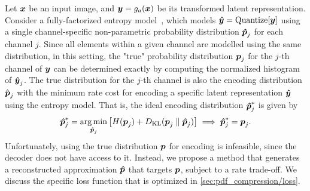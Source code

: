 
Let ${\boldsymbol{x}}$ be an input image, and ${\boldsymbol{y}} = g_a({\boldsymbol{x}})$ be its transformed latent representation.
Consider a fully-factorized entropy model~\cite{balle2018variational}, which models ${\boldsymbol{\hat{y}}} = \operatorname{Quantize}[{\boldsymbol{y}}]$ using a single channel-specific non-parametric probability distribution ${\boldsymbol{\hat{p}}}_j$ for each channel $j$.
Since all elements within a given channel are modelled using the same distribution, in this setting, the "true" probability distribution ${\boldsymbol{p}}_j$ for the $j$-th channel of ${\boldsymbol{y}}$ can be determined exactly by computing the normalized histogram of ${\boldsymbol{\hat{y}}}_j$.
The true distribution for the $j$-th channel is also the encoding distribution $\hat{{\boldsymbol{p}}}_j$ with the minimum rate cost for encoding a specific latent representation ${\boldsymbol{\hat{y}}}$ using the entropy model.
That is, the ideal encoding distribution ${\boldsymbol{\hat{p}}}^*_j$ is given by
\begin{equation*}
  {\boldsymbol{\hat{p}}}^*_j = \operatorname*{arg\,min}_{{\boldsymbol{\hat{p}}}_j} \left[
    H({\boldsymbol{p}}_j) + D_{\mathrm{KL}}({\boldsymbol{p}}_j \parallel {\boldsymbol{\hat{p}}}_j)
  \right]
  \implies {\boldsymbol{\hat{p}}}^*_j = {\boldsymbol{p}}_j.
\end{equation*}
Unfortunately, using the true distribution ${\boldsymbol{p}}$ for encoding is infeasible, since the decoder does not have access to it.
Instead, we propose a method that generates a reconstructed approximation ${\boldsymbol{\hat{p}}}$ that targets ${\boldsymbol{p}}$, subject to a rate trade-off.
We discuss the specific loss function that is optimized in \cref{sec:pdf_compression/loss}.

